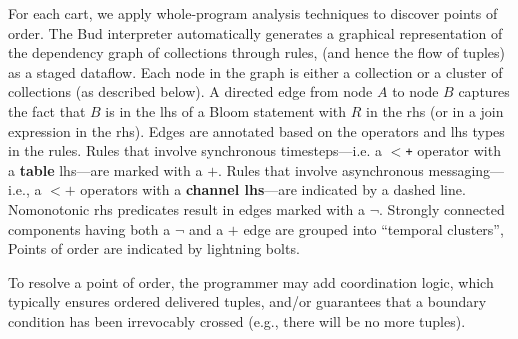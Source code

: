 For each cart, we apply whole-program analysis techniques to discover points of 
order.  The Bud interpreter automatically generates
a graphical representation of the dependency graph of collections through rules,
(and hence the 
flow of tuples) as a staged dataflow.  Each node in the graph is either
a collection or a cluster of collections (as described below).  A directed edge from node $A$ to node $B$ captures the fact that $B$ is in the lhs of a Bloom statement with $R$ in the rhs (or in a join expression in the rhs).  Edges are annotated based on the operators and lhs types in the rules.  Rules that involve synchronous timesteps---i.e. a \texttt{$<$+} operator with a {\bf table} lhs---are marked with a $+$.  Rules that involve asynchronous messaging---i.e., a \texttt{$<+$} operators with a {\bf channel lhs}---are indicated by a dashed line.  Nomonotonic rhs predicates result in edges marked with a $\lnot$.  Strongly connected components having both a $\lnot$ and a $+$ edge are grouped into ``temporal clusters'', 
Points of order are indicated by lightning bolts.

To resolve a point of order, the programmer may add coordination logic, which typically ensures  ordered delivered tuples, and/or guarantees that a boundary condition has been irrevocably crossed (e.g., there will be no more tuples).


